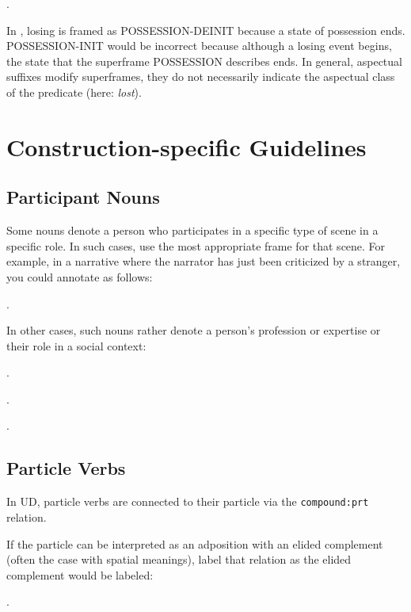 \documentclass[a4paper]{article}
\newcommand{\fr}[1]{\textsf{#1}}
\begin{document}
\ex.

In \Last, losing is framed as \fr{POSSESSION-DEINIT} because a state of
possession ends. \fr{POSSESSION-INIT} would be incorrect because although a
losing event begins, the state that the superframe \fr{POSSESSION} describes
ends. In general, aspectual suffixes modify superframes, they do not
necessarily indicate the aspectual class of the predicate (here: \emph{lost}).


\newpage\section{Construction-specific Guidelines}

\subsection{Participant Nouns}

Some nouns denote a person who participates in a specific type of scene in a
specific role. In such cases, use the most appropriate frame for that scene.
For example, in a narrative where the narrator has just been criticized by a
stranger, you could annotate as follows:

\ex.

In other cases, such nouns rather denote a person's profession or expertise or
their role in a social context:

\ex.

\ex.

\ex.


\newpage\subsection{Particle Verbs}

In UD, particle verbs are connected to their particle via the
\texttt{compound:prt} relation.

If the particle can be interpreted as an adposition with an elided complement
(often the case with spatial meanings), label that relation as the elided
complement would be labeled:

\ex.
\end{document}

